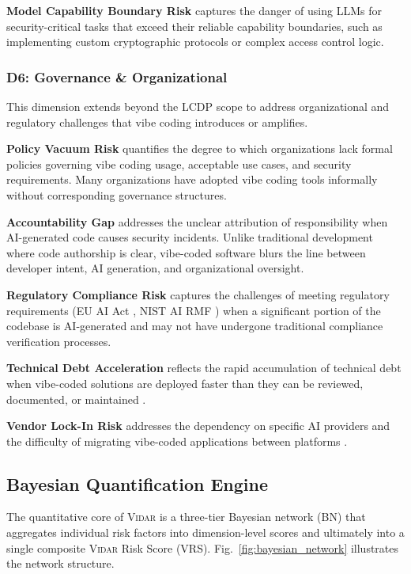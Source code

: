 \documentclass[preprint,review,12pt]{elsarticle}
\newcommand{\vidar}{\textsc{Vidar}}
\begin{document}
\textbf{Model Capability Boundary Risk} captures the danger of using LLMs for security-critical tasks that exceed their reliable capability boundaries, such as implementing custom cryptographic protocols or complex access control logic.


\subsubsection{D6: Governance \& Organizational}
\label{subsubsec:d6}

This dimension extends beyond the LCDP scope to address organizational and regulatory challenges that vibe coding introduces or amplifies.

\textbf{Policy Vacuum Risk} quantifies the degree to which organizations lack formal policies governing vibe coding usage, acceptable use cases, and security requirements. Many organizations have adopted vibe coding tools informally without corresponding governance structures.

\textbf{Accountability Gap} addresses the unclear attribution of responsibility when AI-generated code causes security incidents. Unlike traditional development where code authorship is clear, vibe-coded software blurs the line between developer intent, AI generation, and organizational oversight.

\textbf{Regulatory Compliance Risk} captures the challenges of meeting regulatory requirements (EU AI Act \cite{euaiact2024}, NIST AI RMF \cite{nist2023ai}) when a significant portion of the codebase is AI-generated and may not have undergone traditional compliance verification processes.

\textbf{Technical Debt Acceleration} reflects the rapid accumulation of technical debt when vibe-coded solutions are deployed faster than they can be reviewed, documented, or maintained \cite{besker2018technical}.

\textbf{Vendor Lock-In Risk} addresses the dependency on specific AI providers and the difficulty of migrating vibe-coded applications between platforms \cite{opara2016critical}.


\subsection{Bayesian Quantification Engine}
\label{subsec:bayesian}

The quantitative core of \vidar{} is a three-tier Bayesian network (BN) that aggregates individual risk factors into dimension-level scores and ultimately into a single composite \vidar{} Risk Score (VRS). Fig.~\ref{fig:bayesian_network} illustrates the network structure.
\end{document}

